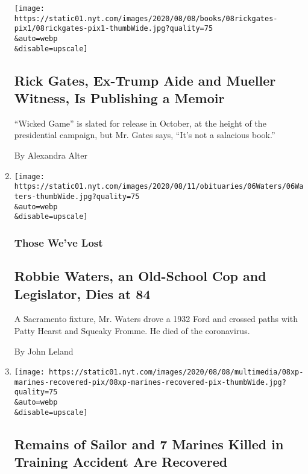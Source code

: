\begin{enumerate}
  \texttt{[image: https://static01.nyt.com/images/2020/08/08/books/08rickgates-pix1/08rickgates-pix1-thumbWide.jpg?quality=75\\\&auto=webp\\\&disable=upscale]}

  \hypertarget{rick-gates-ex-trump-aide-and-mueller-witness-is-publishing-a-memoir}{%
  \subsection{Rick Gates, Ex-Trump Aide and Mueller Witness, Is
  Publishing a
  Memoir}\label{rick-gates-ex-trump-aide-and-mueller-witness-is-publishing-a-memoir}}

  ``Wicked Game'' is slated for release in October, at the height of the
  presidential campaign, but Mr. Gates says, ``It's not a salacious
  book.''

  By Alexandra Alter
\item
  \href{/2020/08/08/obituaries/robbie-waters-dead-coronavirus.html}{}

  \texttt{[image: https://static01.nyt.com/images/2020/08/11/obituaries/06Waters/06Waters-thumbWide.jpg?quality=75\\\&auto=webp\\\&disable=upscale]}

  \hypertarget{those-weve-lost}{%
  \subsubsection{Those We've Lost}\label{those-weve-lost}}

  \hypertarget{robbie-waters-an-old-school-cop-and-legislator-dies-at-84}{%
  \subsection{Robbie Waters, an Old-School Cop and Legislator, Dies at
  84}\label{robbie-waters-an-old-school-cop-and-legislator-dies-at-84}}

  A Sacramento fixture, Mr. Waters drove a 1932 Ford and crossed paths
  with Patty Hearst and Squeaky Fromme. He died of the coronavirus.

  By John Leland
\item
  \href{/2020/08/08/us/marines-training-accident-recovered.html}{}

  \texttt{[image: https://static01.nyt.com/images/2020/08/08/multimedia/08xp-marines-recovered-pix/08xp-marines-recovered-pix-thumbWide.jpg?quality=75\\\&auto=webp\\\&disable=upscale]}

  \hypertarget{remains-of-sailor-and-7-marines-killed-in-training-accident-are-recovered}{%
  \subsection{Remains of Sailor and 7 Marines Killed in Training
  Accident Are
  Recovered}\label{remains-of-sailor-and-7-marines-killed-in-training-accident-are-recovered}}


\end{enumerate}
